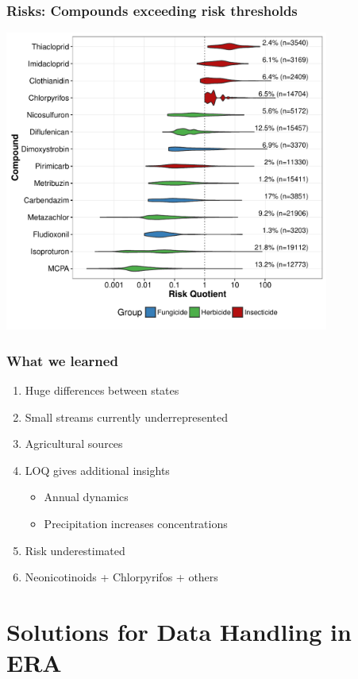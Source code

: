 \documentclass[
	10pt
	]{beamer}
\begin{document}
\begin{frame}
\frametitle{Risks: Compounds exceeding risk thresholds}
	\includegraphics[width = 0.8\textwidth]{figs/compounds.pdf}
\end{frame}


\begin{frame}
\frametitle{What we learned}
	\begin{enumerate}
		\item Huge differences between \alert{states}
		\item Small streams currently \alert{underrepresented}
		\item \alert{Agricultural} sources
		\item \alert{LOQ} gives additional insights
			\begin{itemize}
				\item Annual \alert{dynamics}
				\item \alert{Precipitation} increases concentrations
			\end{itemize}
		\item Risk \alert{underestimated} 
		\item \alert{Neonicotinoids} + Chlorpyrifos + others
	\end{enumerate}
\end{frame}



\section{Solutions for Data Handling in ERA}
\end{document}
